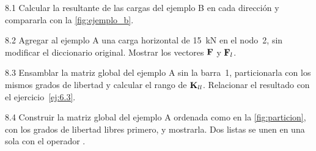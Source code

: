 \begin{ejercicio}{8.1}
Calcular la resultante de las cargas del ejemplo B en cada dirección y
compararla con la \cref{fig:ejemplo_b}.
\end{ejercicio}

\begin{ejercicio}{8.2}
Agregar al ejemplo A una carga horizontal de \SI{15}{\kilo\newton} en el
nodo~2, sin modificar el diccionario  original. Mostrar los
vectores $\mathbf{F}$ y $\mathbf{F}_l$.
\end{ejercicio}

\begin{ejercicio}{8.3}
Ensamblar la matriz global del ejemplo A sin la barra~1, particionarla con
los mismos grados de libertad y calcular el rango de $\mathbf{K}_{ll}$. Relacionar el
resultado con el ejercicio~\ref{ej:6.3}.
\end{ejercicio}

\begin{ejercicio}{8.4}
Construir la matriz global del ejemplo A ordenada como en la
\cref{fig:particion}, con los grados de libertad libres primero, y mostrarla.
Dos listas se unen en una sola con el operador \py{+}.
\end{ejercicio}

